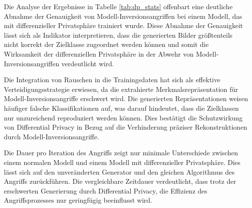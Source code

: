 \begin{table}[h]
	\centering
	\renewcommand{\arraystretch}{1.5}
	\caption{Auswertung zweier Angriffsalgorithmen auf \glqq abgesicherte\grqq{} und ungeschützte Modelle}
	\label{tab:dp_stats}
\end{table}

Die Analyse der Ergebnisse in Tabelle \ref{tab:dp_stats} offenbart eine deutliche Abnahme der Genauigkeit von Modell-Inversionsangriffen bei einem Modell, das mit differenzieller Privatsphäre trainiert wurde. Diese Abnahme der Genauigkeit lässt sich als Indikator interpretieren, dass die generierten Bilder größtenteils nicht korrekt der Zielklasse zugeordnet werden können und somit die Wirksamkeit der differenziellen Privatsphäre in der Abwehr von Modell-Inversionsangriffen verdeutlicht wird.

Die Integration von Rauschen in die Trainingsdaten hat sich als effektive Verteidigungsstrategie erwiesen, da die extrahierte Merkmalsrepräsentation für Modell-Inversionsangriffe erschwert wird. Die generierten Repräsentationen weisen häufiger falsche Klassifikationen auf, was darauf hindeutet, dass die Zielklassen nur unzureichend reproduziert werden können. Dies bestätigt die Schutzwirkung von Differential Privacy in Bezug auf die Verhinderung präziser Rekonstruktionen durch Modell-Inversionsangriffe.

Die Dauer pro Iteration des Angriffs zeigt nur minimale Unterschiede zwischen einem normalen Modell und einem Modell mit differenzieller Privatsphäre. Dies lässt sich auf den unveränderten Generator und den gleichen Algorithmus des Angriffs zurückführen. Die vergleichbare Zeitdauer verdeutlicht, dass trotz der erschwerten Generierung durch Differential Privacy, die Effizienz des Angriffsprozesses nur geringfügig beeinflusst wird.

